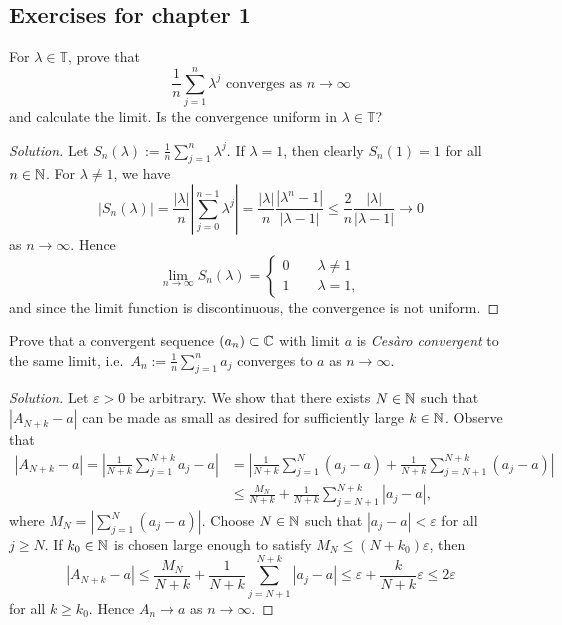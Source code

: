 \subsection{Exercises for chapter 1}

\begin{exercise}
	\label{exer:torus-cesaro}
	For $\lambda \in \mathbb{T}$, prove that
	\begin{equation*}
		\frac{1}{n} \sum_{j=1}^n \lambda^j \text{ converges as } n \to \infty
	\end{equation*}
	and calculate the limit. Is the convergence uniform in $\lambda \in \mathbb{T}$?
\end{exercise}

\begin{proof}[Solution]
	Let $S_n(\lambda) := \frac{1}{n}\sum_{j=1}^n \lambda^j$. If $\lambda=1$, then clearly $S_n(1) = 1$ for all $n\in\mathbb{N}$. For $\lambda \ne 1$, we have
	\begin{equation*}
		|S_n(\lambda)| = \frac{|\lambda|}{n} \left|\sum_{j=0}^{n-1} \lambda^j \right| = \frac{|\lambda|}{n} \frac{|\lambda^n - 1|}{|\lambda - 1|} \le \frac{2}{n} \frac{|\lambda|}{|\lambda-1|} \longrightarrow 0
	\end{equation*}
	as $n\to\infty$. Hence
	\begin{equation*}
		\lim_{n \to \infty} S_n(\lambda) = \begin{cases}
			0 \qquad \lambda \ne 1 \\
			1 \qquad \lambda = 1,
		\end{cases}
	\end{equation*}
	and since the limit function is discontinuous, the convergence is not uniform.
\end{proof}

\begin{exercise}
	Prove that a convergent sequence $(a_n) \subset \mathbb{C}$ with limit $a$ is \emph{Ces\`{a}ro convergent} to the same limit, i.e.\ $A_n := \frac{1}{n}\sum_{j=1}^n a_j$ converges to $a$ as $n\to\infty$.
\end{exercise}

\begin{proof}[Solution]
	Let $\varepsilon >0$ be arbitrary. We show that there exists $N\in\mathbb{N}$ such that $|A_{N+k}-a|$ can be made as small as desired for sufficiently large $k\in\mathbb{N}$. Observe that
	\begin{align*}
		|A_{N+k}-a| = \left| \frac{1}{N+k}\sum_{j=1}^{N+k}a_j - a\right| &= \left|\frac{1}{N+k}\sum_{j=1}^N (a_j-a) + \frac{1}{N+k}\sum_{j=N+1}^{N+k}(a_j - a)\right| \\
		&\le \frac{M_N}{N+k} + \frac{1}{N+k}\sum_{j=N+1}^{N+k}|a_j-a|,
	\end{align*}
	where $M_N = |\sum_{j=1}^N (a_j-a)|$. Choose $N\in\mathbb{N}$ such that $|a_j-a| < \varepsilon$ for all $j \ge N$. If $k_0\in\mathbb{N}$ is chosen large enough to satisfy $M_N \le (N+k_0)\varepsilon$, then
	\begin{equation*}
		|A_{N+k}-a| \le \frac{M_N}{N+k} + \frac{1}{N+k}\sum_{j=N+1}^{N+k}|a_j-a| \le \varepsilon + \frac{k}{N+k} \varepsilon \le 2\varepsilon
	\end{equation*}
	for all $k\ge k_0$. Hence $A_n \to a$ as $n\to\infty$.
\end{proof}


